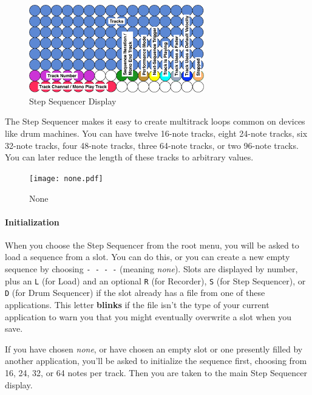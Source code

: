 \documentclass{article}
\begin{document}
\begin{figure}
\vspace{-4.75em}\includegraphics[width=3in]{stepsequencer}
\vspace{-2em}\caption{\small Step Sequencer Display}
\vspace{-1em}
\label{stepsequencer}
\end{figure}

The Step Sequencer makes it easy to create multitrack loops common on devices like drum machines.  You can have twelve 16-note tracks, eight 24-note tracks, six 32-note tracks, four 48-note tracks, three 64-note tracks, or two 96-note tracks.  You can later reduce the length of these tracks to arbitrary values.

\begin{figure}
\vspace{-1em}\texttt{[image: none.pdf]}
\vspace{-2em}\caption{\small None}\vspace{-2em}
\label{none}
\end{figure}

\paragraph{Initialization} When you choose the Step Sequencer from the root menu, you will be asked to load a sequence from a slot.  You can do this, or you can create a new empty sequence by choosing \texttt{-~-~-~-} (meaning {\it none}).  Slots are displayed by number, plus an \texttt{L} (for Load) and an optional \texttt{R} (for Recorder), \texttt{S} (for Step Sequencer), or \texttt{D} (for Drum Sequencer) if the slot already has a file from one of these applications.  This letter {\bf blinks} if the file isn't the type of your current application to warn you that you might eventually overwrite a slot when you save.

If you have chosen {\it none}, or have chosen an empty slot or one presently filled by another application, you'll be asked to initialize the sequence first, choosing from 16, 24, 32, or 64 notes per track. Then you are taken to the main Step Sequencer display.  
\end{document}
